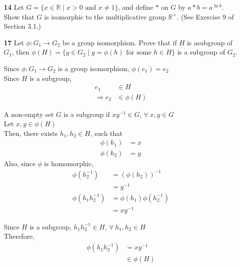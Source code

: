 \documentclass[paper=usletter, fontsize=12pt]{article}
\begin{document}
\begin{itemize}
\begin{itemize}
            \item[\textbf{14}] Let $G=\{x \in \mathbb{R} \mid x > 0 \text{ and
            } x \neq 1\}$, and define $*$ on $G$ by $a * b = a^{\ln{b}}$. Show
            that $G$ is isomorphic to the multiplicative group
            $\mathbb{R}^{\times}$. (See Exercise 9 of Section 3.1.)
            \begin{cproof}
            \end{cproof}

            \item[\textbf{17}] Let $\phi: G_1 \rightarrow G_2$ be a group
            isomorphism. Prove that if $H$ is asubgroup of $G_1$, then
            $\phi(H)=\{y\in G_2 \mid y = \phi(h) \text{ for some } h \in H\}$
            is a subgroup of $G_2$.
            \begin{cproof}

                Since $\phi:G_1 \rightarrow G_2$ is a group isomorphism,
                $\phi(e_1)=e_2$\\
                Since $H$ is a subgroup,
                \begin{align*}
                    e_1 & \in H\\
                    \Rightarrow e_2 & \in \phi(H)
                \end{align*}

                A non-empty set $G$ is a subgroup if $xy^{-1}\in G$, $\forall \
                x,y\in G$\\
                Let $x,y \in \phi(H)$\\
                Then, there exists $h_1,h_2 \in H$, such that
                \begin{align*}
                    \phi(h_1) & = x\\
                    \phi(h_2) & = y
                \end{align*}
                Also, since $\phi$ is homomorphic,
                \begin{align*}
                    \phi(h_2^{-1}) & = (\phi(h_2))^{-1}\\
                    & = y^{-1}\\
                    \phi(h_1h_2^{-1}) & = \phi(h_1)\phi(h_2^{-1})\\
                    & = xy^{-1}
                \end{align*}

                Since $H$ is a subgroup, $h_1h_2^{-1}\in H$, $\forall \ h_1,h_2
                \in H$\\
                Therefore,
                \begin{align*}
                    \phi(h_1h_2^{-1}) & = xy^{-1}\\
                    & \in \phi(H)
                \end{align*}


\end{cproof}
\end{itemize}
\end{itemize}
\end{document}
